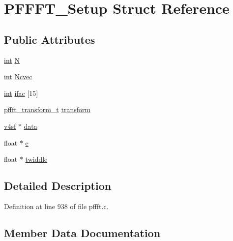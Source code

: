 \hypertarget{struct_p_f_f_f_t___setup}{}\section{P\+F\+F\+F\+T\+\_\+\+Setup Struct Reference}
\label{struct_p_f_f_f_t___setup}
\subsection*{Public Attributes}
\begin{DoxyCompactItemize}
\item 
\hyperlink{xmltok_8h_a5a0d4a5641ce434f1d23533f2b2e6653}{int} \hyperlink{struct_p_f_f_f_t___setup_a328951e60dcbf47bb9d89946cf67571d}{N}
\item 
\hyperlink{xmltok_8h_a5a0d4a5641ce434f1d23533f2b2e6653}{int} \hyperlink{struct_p_f_f_f_t___setup_abd11f546bae7f16ca052958bf000116d}{Ncvec}
\item 
\hyperlink{xmltok_8h_a5a0d4a5641ce434f1d23533f2b2e6653}{int} \hyperlink{struct_p_f_f_f_t___setup_a71ab430945d91b2e534e1c6c50a7fbdf}{ifac} \mbox{[}15\mbox{]}
\item 
\hyperlink{pffft_8h_af5506e26b5d8295b89aa0186261dfef1}{pffft\+\_\+transform\+\_\+t} \hyperlink{struct_p_f_f_f_t___setup_a980def09ec15883c12689443d97a36b5}{transform}
\item 
\hyperlink{pffft_8c_a86dc70e405aed6b6ea7e66b134e00088}{v4sf} $\ast$ \hyperlink{struct_p_f_f_f_t___setup_a52a6ca29e3a4c59f54070a622db4ec3f}{data}
\item 
float $\ast$ \hyperlink{struct_p_f_f_f_t___setup_af063d9d895bb58628cd9116079cc72b6}{e}
\item 
float $\ast$ \hyperlink{struct_p_f_f_f_t___setup_acda18fead895e0d4e29bcda839bb9ccf}{twiddle}
\end{DoxyCompactItemize}


\subsection{Detailed Description}


Definition at line 938 of file pffft.\+c.



\subsection{Member Data Documentation}
